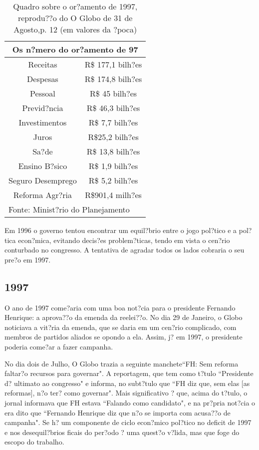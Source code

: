 \documentclass{article}
\begin{document}
\begin{table}[h]
\begin{center}
\begin{tabular}[c]{|c c|}
\multicolumn{2}{c}{\large\textbf{Os n?mero do or?amento de 97}}\\ \hline \normalsize
 Receitas & R\$ 177,1 bilh?es   \\ \hline
 Despesas & R\$ 174,8 bilh?es  \\ \hline
 Pessoal &  R\$ 45 bilh?es  \\ \hline
 Previd?ncia & R\$ 46,3 bilh?es   \\ \hline
 Investimentos & R\$ 7,7 bilh?es  \\ \hline
 Juros &  R\$25,2 bilh?es \\ \hline
 Sa?de & R\$ 13,8 bilh?es \\ \hline
 Ensino B?sico &  R\$ 1,9 bilh?es \\ \hline
 Seguro Desemprego & R\$ 5,2 bilh?es  \\ \hline
 Reforma Agr?ria &  R\$901,4 milh?es \\ \hline
\multicolumn{2}{l}{Fonte: Minist?rio do Planejamento} \\
\end{tabular}
\caption{Quadro sobre o or?amento de 1997, reprodu??o do O Globo de 31 de Agosto,p. 12 (em valores da ?poca)}
\end{center}
\end{table}

Em 1996 o governo tentou encontrar um equil?brio entre o jogo pol?tico e a pol?tica econ?mica, evitando decis?es problem?ticas, tendo em vista o cen?rio conturbado no congresso. A tentativa de agradar todos os lados cobraria o seu pre?o em 1997.  

\subsection*{1997}

O ano de 1997 come?aria com uma boa not?cia para o presidente Fernando Henrique: a aprova??o da emenda da reelei??o. No dia 29 de Janeiro, o Globo noticiava a vit?ria da emenda, que se daria em um cen?rio complicado, com membros de partidos aliados se opondo a ela. Assim, j? em 1997, o presidente poderia come?ar a fazer campanha.

No dia dois de Julho, O Globo trazia a seguinte manchete``FH: Sem reforma faltar?o recursos para governar". A reportagem, que tem como t?tulo ``Presidente d? ultimato ao congresso" e informa, no subt?tulo que ``FH diz que, sem elas [as reformas], n?o ter? como governar". Mais significativo ? que, acima do t?tulo, o jornal informava que FH estava ``Falando como candidato", e na pr?pria not?cia o era dito que ``Fernando Henrique diz que n?o se importa com acusa??o de campanha". Se h? um componente de ciclo econ?mico pol?tico no deficit de 1997 e nos desequil?brios ficais do per?odo ? uma quest?o v?lida, mas que foge do escopo do trabalho.
\end{document}
